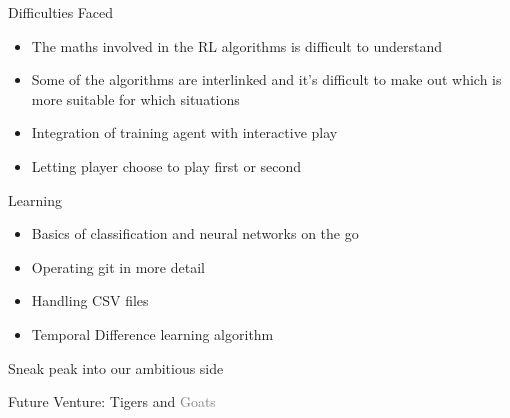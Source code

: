 \documentclass[14pt]{beamer}
\begin{document}
\begin{frame}{Difficulties Faced}
    \begin{itemize}
        \item The maths involved in the RL algorithms is difficult to understand
        \item Some of the algorithms are interlinked and it's difficult to make out which is more suitable for which situations
        \item Integration of training agent with interactive play
        \item Letting player choose to play first or second
    \end{itemize}
\end{frame}

\begin{frame}{Learning}
    \begin{itemize}
        \item Basics of classification and neural networks on the go
        \item Operating git in more detail
        \item Handling CSV files
        \item Temporal Difference learning algorithm
    \end{itemize}
\end{frame}

\begin{frame}{Sneak peak into our ambitious side}
    \begin{center}
        Future Venture: \textcolor{myAmber}{Tigers} and \textcolor{gray}{Goats}
    \end{center}
\end{frame}
\end{document}
